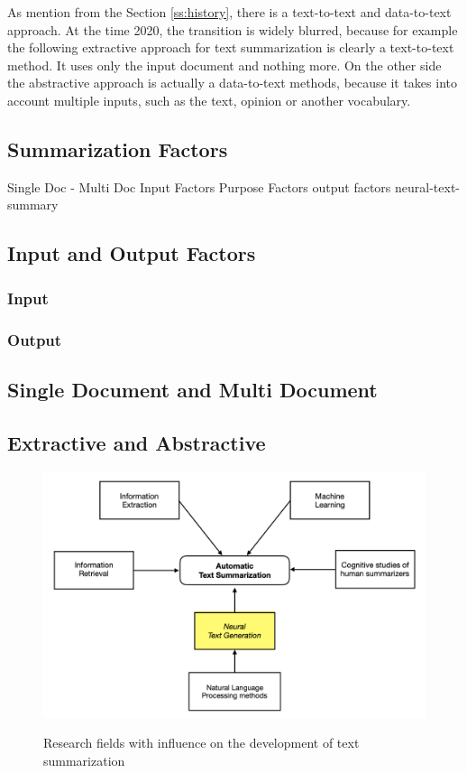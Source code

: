 As mention from the Section \ref{ss:history}, there is a text-to-text and data-to-text approach. At the time 2020, the transition is widely blurred, because for example the following extractive approach for text summarization is clearly a text-to-text method. It uses only the input document and nothing more. On the other side the abstractive approach is actually a data-to-text methods, because it takes into account multiple inputs, such as the text, opinion or another vocabulary.



\subsection{Summarization Factors}

Single Doc - Multi Doc
Input Factors
Purpose Factors
output factors
neural-text-summary

\subsection{Input and Output Factors}
\subsubsection{Input}
\subsubsection{Output}
\subsection{Single Document and Multi Document}
\subsection{Extractive and Abstractive}


\begin{figure}
	\begin{center}
		\includegraphics[width=5.5in]{photos/summ}\\
		\caption{Research fields with influence on the development of text summarization}\label{summ}
	\end{center}
\end{figure}

